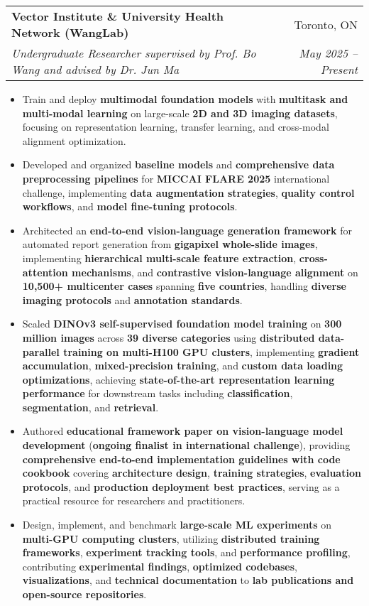 \documentclass[letterpaper,11pt]{article}
\makeatletter
\newcommand{\resumeItem}[1]{
  \item\small{
    {#1 \vspace{-5pt}}
  }
}
\newcommand{\resumeSubheading}[4]{
  \vspace{-2pt}\item
    \begin{tabular*}{0.97\textwidth}[t]{l@{\extracolsep{\fill}}r}
      \textbf{#1} & #2 \\
      \textit{\small#3} & \textit{\small #4} \\
    \end{tabular*}\vspace{-7pt}
}
\newcommand{\resumeItemListStart}{\begin{itemize}}
\newcommand{\resumeItemListEnd}{\end{itemize}\vspace{-5pt}}
\makeatother
\begin{document}
  \resumeSubheading
  {Vector Institute \& University Health Network (WangLab)}{Toronto, ON}
  {Undergraduate Researcher supervised by Prof. Bo Wang and advised by Dr. Jun Ma}{May 2025 -- Present}
  \resumeItemListStart
    \resumeItem{Train and deploy \textbf{multimodal foundation models} with \textbf{multitask and multi-modal learning} on large-scale \textbf{2D and 3D imaging datasets}, focusing on representation learning, transfer learning, and cross-modal alignment optimization.}
    \resumeItem{Developed and organized \textbf{baseline models} and \textbf{comprehensive data preprocessing pipelines} for \textbf{MICCAI FLARE 2025} international challenge, implementing \textbf{data augmentation strategies}, \textbf{quality control workflows}, and \textbf{model fine-tuning protocols}.}
    \resumeItem{Architected an \textbf{end-to-end vision-language generation framework} for automated report generation from \textbf{gigapixel whole-slide images}, implementing \textbf{hierarchical multi-scale feature extraction}, \textbf{cross-attention mechanisms}, and \textbf{contrastive vision-language alignment} on \textbf{10,500+ multicenter cases} spanning \textbf{five countries}, handling \textbf{diverse imaging protocols} and \textbf{annotation standards}.}
    \resumeItem{Scaled \textbf{DINOv3 self-supervised foundation model training} on \textbf{300 million images} across \textbf{39 diverse categories} using \textbf{distributed data-parallel training on multi-H100 GPU clusters}, implementing \textbf{gradient accumulation}, \textbf{mixed-precision training}, and \textbf{custom data loading optimizations}, achieving \textbf{state-of-the-art representation learning performance} for downstream tasks including \textbf{classification}, \textbf{segmentation}, and \textbf{retrieval}.}
    \resumeItem{Authored \textbf{educational framework paper on vision-language model development} (\textbf{ongoing finalist in international challenge}), providing \textbf{comprehensive end-to-end implementation guidelines with code cookbook} covering \textbf{architecture design}, \textbf{training strategies}, \textbf{evaluation protocols}, and \textbf{production deployment best practices}, serving as a practical resource for researchers and practitioners.}
    \resumeItem{Design, implement, and benchmark \textbf{large-scale ML experiments} on \textbf{multi-GPU computing clusters}, utilizing \textbf{distributed training frameworks}, \textbf{experiment tracking tools}, and \textbf{performance profiling}, contributing \textbf{experimental findings}, \textbf{optimized codebases}, \textbf{visualizations}, and \textbf{technical documentation} to \textbf{lab publications and open-source repositories}.}
  \resumeItemListEnd
\end{document}
